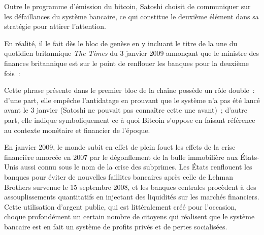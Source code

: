 

Outre le programme d'émission du bitcoin, Satoshi choisit de communiquer sur les défaillances du système bancaire, ce qui constitue le deuxième élément dans sa stratégie pour attirer l'attention.

En réalité, il le fait dès le bloc de genèse en y incluant le titre de la une du quotidien britannique \emph{The Times} du 3 janvier 2009 annonçant que le ministre des finances britannique est sur le point de renflouer les banques pour la deuxième fois~:

\begin{quote}
\end{quote}

Cette phrase présente dans le premier bloc de la chaîne possède un rôle double~: d'une part, elle empêche l'antidatage en prouvant que le système n'a pas été lancé avant le 3 janvier (Satoshi ne pouvait pas connaître cette une avant)~; d'autre part, elle indique symboliquement ce à quoi Bitcoin s'oppose en faisant référence au contexte monétaire et financier de l'époque.

En janvier 2009, le monde subit en effet de plein fouet les effets de la crise financière amorcée en 2007 par le dégonflement de la bulle immobilière aux États-Unis aussi connu sous le nom de la crise des subprimes. Les États renflouent les banques pour éviter de nouvelles faillites bancaires après celle de Lehman Brothers survenue le 15 septembre 2008, et les banques centrales procèdent à des assouplissements quantitatifs en injectant des liquidités sur les marchés financiers. Cette utilisation d'argent public, qui est littéralement créé pour l'occasion, choque profondément un certain nombre de citoyens qui réalisent que le système bancaire est en fait un système de profits privés et de pertes socialisées.


